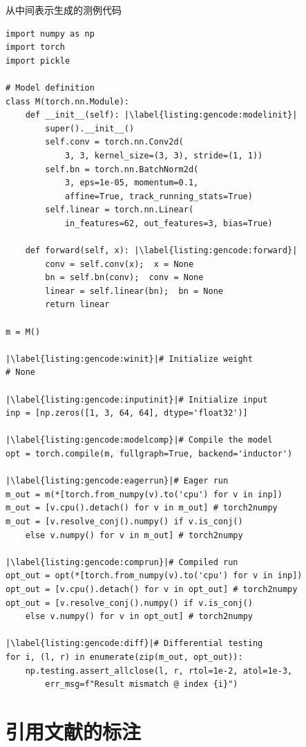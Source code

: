 \begin{listing}[]
    \caption{从中间表示生成的测例代码}
    \label{listing:gencode}
\begin{verbatim}
import numpy as np
import torch
import pickle

# Model definition
class M(torch.nn.Module):
    def __init__(self): |\label{listing:gencode:modelinit}|
        super().__init__()
        self.conv = torch.nn.Conv2d(
            3, 3, kernel_size=(3, 3), stride=(1, 1))
        self.bn = torch.nn.BatchNorm2d(
            3, eps=1e-05, momentum=0.1,
            affine=True, track_running_stats=True)
        self.linear = torch.nn.Linear(
            in_features=62, out_features=3, bias=True)

    def forward(self, x): |\label{listing:gencode:forward}|
        conv = self.conv(x);  x = None
        bn = self.bn(conv);  conv = None
        linear = self.linear(bn);  bn = None
        return linear

m = M()

|\label{listing:gencode:winit}|# Initialize weight
# None

|\label{listing:gencode:inputinit}|# Initialize input
inp = [np.zeros([1, 3, 64, 64], dtype='float32')]

|\label{listing:gencode:modelcomp}|# Compile the model
opt = torch.compile(m, fullgraph=True, backend='inductor')

|\label{listing:gencode:eagerrun}|# Eager run
m_out = m(*[torch.from_numpy(v).to('cpu') for v in inp])
m_out = [v.cpu().detach() for v in m_out] # torch2numpy
m_out = [v.resolve_conj().numpy() if v.is_conj()
    else v.numpy() for v in m_out] # torch2numpy

|\label{listing:gencode:comprun}|# Compiled run
opt_out = opt(*[torch.from_numpy(v).to('cpu') for v in inp])
opt_out = [v.cpu().detach() for v in opt_out] # torch2numpy
opt_out = [v.resolve_conj().numpy() if v.is_conj()
    else v.numpy() for v in opt_out] # torch2numpy

|\label{listing:gencode:diff}|# Differential testing
for i, (l, r) in enumerate(zip(m_out, opt_out)):
    np.testing.assert_allclose(l, r, rtol=1e-2, atol=1e-3,
        err_msg=f"Result mismatch @ index {i}")
\end{verbatim}
\end{listing}

\iffalse
\chapter{引用文献的标注}

